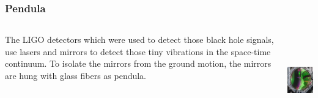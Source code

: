 \documentclass[pdf,hideothersubsections]{beamer}
\begin{document}
\begin{frame}
\frametitle{Pendula}

\begin{columns}[T]
   \begin{column}{0.5\textwidth}
    The LIGO detectors which were used to detect those black hole signals, use lasers and mirrors\footnotemark 
to detect those tiny vibrations in the space-time continuum. To isolate the mirrors from the ground motion, the mirrors are hung with 
glass fibers as pendula\footnotemark.

   \end{column}

   \pause
   \begin{column}{0.5\textwidth}

   \includegraphics[height=4cm]{LIGO-Mirror.jpg}      
   \end{column}
  
\end{columns}

\end{frame}
\end{document}
